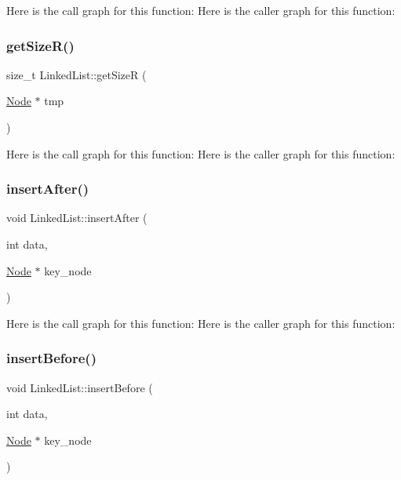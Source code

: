 Here is the call graph for this function\+:
Here is the caller graph for this function\+:
\mbox{\label{class_linked_list_af4b27646ebfb44d2fd0625b8ad1fb136}} 
\subsubsection{\texorpdfstring{get\+Size\+R()}{getSizeR()}}
{\footnotesize\ttfamily size\+\_\+t Linked\+List\+::get\+SizeR (\begin{DoxyParamCaption}\item[{\hyperlink{class_node}{Node} $\ast$}]{tmp }\end{DoxyParamCaption})}

Here is the call graph for this function\+:
Here is the caller graph for this function\+:
\mbox{\label{class_linked_list_af508f8b52bbcf1485a1552ac8fc84b81}} 
\subsubsection{\texorpdfstring{insert\+After()}{insertAfter()}}
{\footnotesize\ttfamily void Linked\+List\+::insert\+After (\begin{DoxyParamCaption}\item[{int}]{data,  }\item[{\hyperlink{class_node}{Node} $\ast$}]{key\+\_\+node }\end{DoxyParamCaption})}

Here is the call graph for this function\+:
Here is the caller graph for this function\+:
\mbox{\label{class_linked_list_a895ad950cc619c9cf72273e5e59a100f}} 
\subsubsection{\texorpdfstring{insert\+Before()}{insertBefore()}}
{\footnotesize\ttfamily void Linked\+List\+::insert\+Before (\begin{DoxyParamCaption}\item[{int}]{data,  }\item[{\hyperlink{class_node}{Node} $\ast$}]{key\+\_\+node }\end{DoxyParamCaption})}

